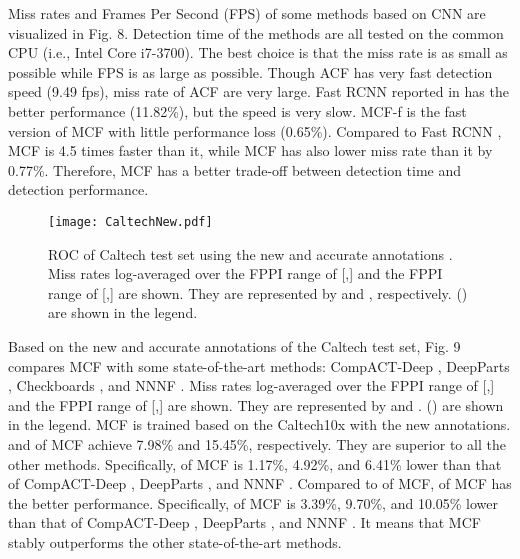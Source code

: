 \documentclass[journal]{IEEEtran}
\begin{document}
Miss rates and Frames Per Second (FPS) of some methods based on CNN are visualized in Fig. 8. Detection time of the methods are all tested on the common CPU (i.e., Intel Core i7-3700). The best choice is that the miss rate is as small as possible while FPS is as large as possible. Though ACF \cite{Dollar_ACF_PAMI_2014} has very fast detection speed (9.49 fps), miss rate of ACF are very large. Fast RCNN reported in \cite{Li_ScaleAware_arXiv_2015} has the better performance (11.82\%), but the speed is very slow. MCF-f is the fast version of MCF with little performance loss (0.65\%). Compared to Fast RCNN \cite{Li_ScaleAware_arXiv_2015}, MCF is 4.5 times faster than it, while MCF has also lower miss rate than it by 0.77\%. Therefore, MCF has a better trade-off between detection time and detection performance.

\begin{figure}[!t]
\label{CaltechNew}
\centering
\texttt{[image: CaltechNew.pdf]}
\caption{ROC of Caltech test set using the new and accurate annotations \cite{Zhang_RotatedFilters_arXiv_2016}. Miss rates log-averaged over the FPPI range of [,] and the FPPI range of [,] are shown. They are represented by  and , respectively.  () are shown in the legend.} 
\end{figure}

Based on the new and accurate annotations of the Caltech test set, Fig. 9 compares MCF with some state-of-the-art methods: CompACT-Deep \cite{Cai_CompACT_ICCV_2015}, DeepParts \cite{Tian_DeepParts_ICCV_2015}, Checkboards \cite{Zhang_FCF_CVPR_2015}, and NNNF \cite{Cao_NNNF_arXiv_2015}. Miss rates log-averaged over the FPPI range of [,] and the FPPI range of [,] are shown. They are represented by  and .  () are shown in the legend. MCF is trained based on the Caltech10x with the new annotations.  and  of MCF achieve 7.98\% and 15.45\%, respectively. They are superior to all the other methods. Specifically,  of MCF is 1.17\%, 4.92\%, and 6.41\% lower than that of CompACT-Deep \cite{Cai_CompACT_ICCV_2015}, DeepParts \cite{Tian_DeepParts_ICCV_2015}, and NNNF \cite{Cao_NNNF_arXiv_2015}. Compared to  of MCF,  of MCF has the better performance. Specifically,  of MCF is 3.39\%, 9.70\%, and 10.05\% lower than that of CompACT-Deep \cite{Cai_CompACT_ICCV_2015}, DeepParts \cite{Tian_DeepParts_ICCV_2015}, and NNNF \cite{Cao_NNNF_arXiv_2015}. It means that MCF stably outperforms the other state-of-the-art methods.
\end{document}
